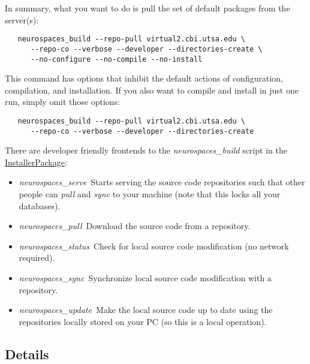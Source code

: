 \documentclass[12pt]{article}
\begin{document}
In summary, what you want to do is pull the set of default packages from the server(s):
\begin{verbatim}
   neurospaces_build --repo-pull virtual2.cbi.utsa.edu \
      --repo-co --verbose --developer --directories-create \
      --no-configure --no-compile --no-install
\end{verbatim}
This command has options that inhibit the default actions of configuration, compilation, and installation. If you also want to compile and install in just one run, simply omit those options:
\begin{verbatim}
   neurospaces_build --repo-pull virtual2.cbi.utsa.edu \
      --repo-co --verbose --developer --directories-create
\end{verbatim}
There are developer friendly frontends to the {\it neurospaces\_build} script in the \href{../installerpackage/installerpackage.tex}{InstallerPackage}:
\begin{itemize}
\item {\it neurospaces\_serve}\,\,\,Starts serving the source code repositories such that other people can {\it pull} and {\it sync} to your machine (note that this locks all your databases).
\item {\it neurospaces\_pull}\,\,\,Download the source code from a repository.
\item {\it neurospaces\_status}\,\,\,Check for local source code modification (no network required).
\item {\it neurospaces\_sync}\,\,\,Synchronize local source code modification with a repository.
\item {\it neurospaces\_update}\,\,\,Make the local source code up to date using the repositories locally stored on your PC (so this is a local operation). 
\end{itemize}

\subsection*{Details}
\end{document}
